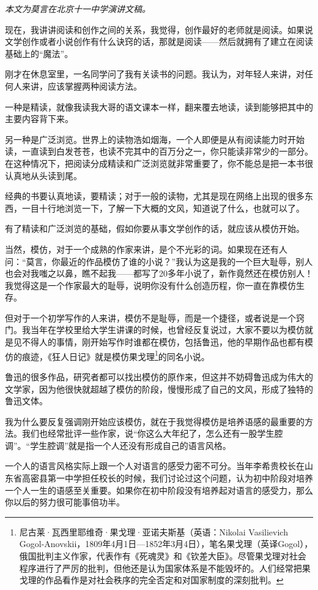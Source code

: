 \documentclass[fontset=fandol,12pt,a5paper]{ctexbook}
\begin{document}
\emph{本文为莫言在北京十一中学演讲文稿。}
\vspace{2em}

现在，我讲讲阅读和创作之间的关系，我觉得，创作最好的老师就是阅读。如果说文学创作或者小说创作有什么诀窍的话，那就是阅读——然后就拥有了建立在阅读基础上的“魔法”。

刚才在休息室里，一名同学问了我有关读书的问题。我认为，对年轻人来讲，对任何人来讲，应该掌握两种阅读方法。

一种是精读，就像我读我大哥的语文课本一样，翻来覆去地读，读到能够把其中的主要内容背下来。

另一种是广泛浏览。世界上的读物浩如烟海，一个人即便是从有阅读能力时开始读，一直读到白发苍苍，也读不完其中的百万分之一，你只能读非常少的一部分。在这种情况下，把阅读分成精读和广泛浏览就非常重要了，你不能总是把一本书很认真地从头读到尾。

经典的书要认真地读，要精读；对于一般的读物，尤其是现在网络上出现的很多东西，一目十行地浏览一下，了解一下大概的文风，知道说了什么，也就可以了。

有了精读和广泛浏览的基础，假如你要从事文学创作的话，就应该从模仿开始。

当然，模仿，对于一个成熟的作家来讲，是个不光彩的词。如果现在还有人问：“莫言，你最近的作品模仿了谁的小说？”我认为这是我的一个巨大耻辱，别人也会对我嗤之以鼻，瞧不起我——都写了20多年小说了，新作竟然还在模仿别人！我觉得这是一个作家最大的耻辱，说明你没有什么创造历程，你一直在靠模仿生存。

但对于一个初学写作的人来讲，模仿不是耻辱，而是一个捷径，或者说是一个窍门。我当年在学校里给大学生讲课的时候，也曾经反复说过，大家不要以为模仿就是见不得人的事情，刚开始写作时谁都在模仿，包括鲁迅，他的早期作品也都有模仿的痕迹，《狂人日记》就是模仿果戈理\footnote{尼古莱·瓦西里耶维奇·果戈理·亚诺夫斯基（英语：Nikolai Vasilievich Gogol-Anovskii，1809年4月1日—1852年3月4日），笔名果戈理（英译Gogol），俄国批判主义作家，代表作有《死魂灵》和《钦差大臣》。尽管果戈理对社会程序进行了严厉的批判，但他还是认为国家体系是不能毁坏的。人们经常把果戈理的作品看作是对社会秩序的完全否定和对国家制度的深刻批判。}的同名小说。

鲁迅的很多作品，研究者都可以找出模仿的原作来，但这并不妨碍鲁迅成为伟大的文学家，因为他很快就超越了模仿的阶段，慢慢形成了自己的文风，形成了独特的鲁迅文体。

我为什么要反复强调刚开始应该模仿，就在于我觉得模仿是培养语感的最重要的方法。我们也经常批评一些作家，说“你这么大年纪了，怎么还有一股学生腔调”。“学生腔调”就是指一个人还没有形成自己的语言风格。

一个人的语言风格实际上跟一个人对语言的感受力密不可分。当年李希贵校长在山东省高密县第一中学担任校长的时候，我们讨论过这个问题，认为初中阶段对培养一个人一生的语感至关重要。如果你在初中阶段没有培养起对语言的感受力，那么你以后的努力很可能事倍功半。
\end{document}
